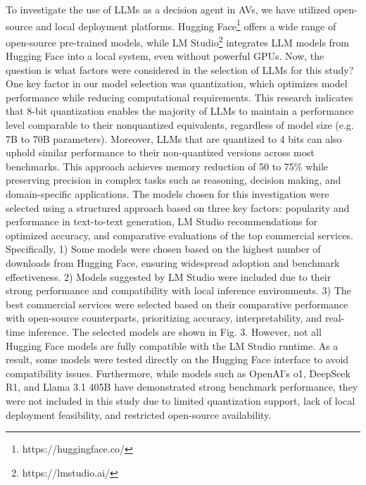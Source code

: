 \documentclass[conference]{IEEEtran}
\begin{document}
To investigate the use of LLMs as a decision agent in AVs, we have utilized open-source and local deployment platforms. Hugging Face\footnote{https://huggingface.co/} offers a wide range of open-source pre-trained models, while LM Studio\footnote{https://lmstudio.ai/} integrates LLM models from Hugging Face into a local system, even without powerful GPUs. Now, the question is what factors were considered in the selection of LLMs for this study? One key factor in our model selection was quantization, which optimizes model performance while reducing computational requirements. This research\cite{xiao2023smoothquant} indicates that 8-bit quantization enables the majority of LLMs to maintain a performance level comparable to their nonquantized equivalents, regardless of model size (e.g. 7B to 70B parameters). Moreover, LLMs that are quantized to 4 bits can also uphold similar performance to their non-quantized versions across most benchmarks. This approach achieves memory reduction of 50 to 75\% while preserving precision in complex tasks such as reasoning, decision making, and domain-specific applications. 
The models chosen for this investigation were selected using a structured approach based on three key factors: popularity and performance in text-to-text generation, LM Studio recommendations for optimized accuracy, and comparative evaluations of the top commercial services. Specifically, 1) Some models were chosen based on the highest number of downloads from Hugging Face, ensuring widespread adoption and benchmark effectiveness. 2) Models suggested by LM Studio were included due to their strong performance and compatibility with local inference environments. 3) The best commercial services were selected based on their comparative performance with open-source counterparts, prioritizing accuracy, interpretability, and real-time inference. The selected models are shown in Fig. 3. However, not all Hugging Face models are fully compatible with the LM Studio runtime. As a result, some models were tested directly on the Hugging Face interface to avoid compatibility issues. Furthermore, while models such as OpenAI’s o1, DeepSeek R1, and Llama 3.1 405B have demonstrated strong benchmark performance, they were not included in this study due to limited quantization support, lack of local deployment feasibility, and restricted open-source availability.
\end{document}
